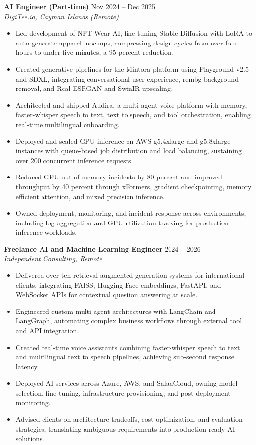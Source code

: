 \documentclass[10pt,letterpaper]{article}
\begin{document}
\textbf{AI Engineer (Part-time)} \hfill Nov 2024 -- Dec 2025\\
\textit{DigiTee.io, Cayman Islands (Remote)}
\begin{itemize}
\item Led development of NFT Wear AI, fine-tuning Stable Diffusion with LoRA to auto-generate apparel mockups, compressing design cycles from over four hours to under five minutes, a 95 percent reduction.
\item Created generative pipelines for the Mintora platform using Playground v2.5 and SDXL, integrating conversational user experience, rembg background removal, and Real-ESRGAN and SwinIR upscaling.
\item Architected and shipped Audira, a multi-agent voice platform with memory, faster-whisper speech to text, text to speech, and tool orchestration, enabling real-time multilingual onboarding.
\item Deployed and scaled GPU inference on AWS g5.4xlarge and g5.8xlarge instances with queue-based job distribution and load balancing, sustaining over 200 concurrent inference requests.
\item Reduced GPU out-of-memory incidents by 80 percent and improved throughput by 40 percent through xFormers, gradient checkpointing, memory efficient attention, and mixed precision inference.
\item Owned deployment, monitoring, and incident response across environments, including log aggregation and GPU utilization tracking for production inference workloads.
\end{itemize}

\textbf{Freelance AI and Machine Learning Engineer} \hfill 2024 -- 2026\\
\textit{Independent Consulting, Remote}
\begin{itemize}
\item Delivered over ten retrieval augmented generation systems for international clients, integrating FAISS, Hugging Face embeddings, FastAPI, and WebSocket APIs for contextual question answering at scale.
\item Engineered custom multi-agent architectures with LangChain and LangGraph, automating complex business workflows through external tool and API integration.
\item Created real-time voice assistants combining faster-whisper speech to text and multilingual text to speech pipelines, achieving sub-second response latency.
\item Deployed AI services across Azure, AWS, and SaladCloud, owning model selection, fine-tuning, infrastructure provisioning, and post-deployment monitoring.
\item Advised clients on architecture tradeoffs, cost optimization, and evaluation strategies, translating ambiguous requirements into production-ready AI solutions.
\end{itemize}
\end{document}
